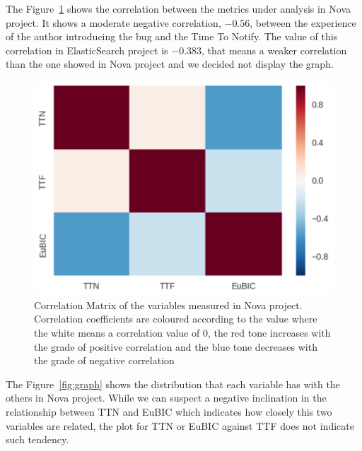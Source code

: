 \documentclass[10pt, conference]{IEEEtran}
\begin{document}
The Figure~\ref{fig:correlation} shows the correlation between the metrics under analysis in Nova project. It shows a moderate negative correlation, $-0.56$, between the experience of the author introducing the bug and the Time To Notify. The value of this correlation in ElasticSearch project is $-0.383$, that means a weaker correlation than the one showed in Nova project and we decided not display the graph.

\begin{figure}[ht]
\centering
\includegraphics[width=\columnwidth]{correlationMatrix.png}
\caption{Correlation Matrix of the variables measured in Nova project. Correlation coefficients are coloured according to the value where the white means a correlation value of 0, the red tone increases with the grade of positive correlation and the blue tone decreases with the grade of negative correlation }
\label{fig:correlation}       %
\end{figure}

The Figure~\ref{fig:graph} shows the distribution that each variable has with the others in Nova project. While we can suspect a negative inclination in the relationship between TTN and EuBIC which indicates how closely this two variables are related, the plot for TTN or EuBIC against TTF does not indicate such tendency.
\end{document}
